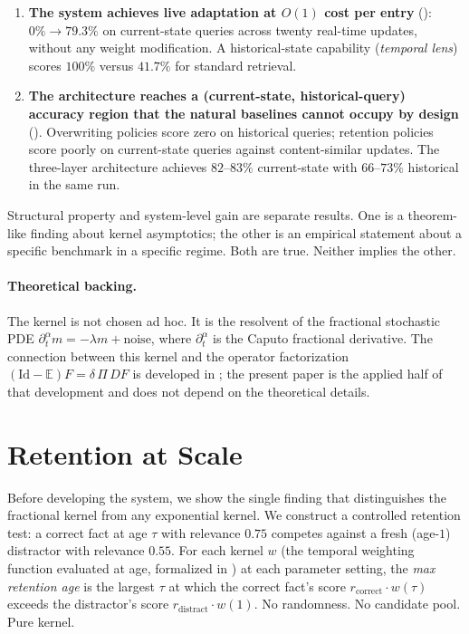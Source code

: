 \documentclass[11pt]{article}
\theoremstyle{plain}
\theoremstyle{definition}
\newcommand{\E}{\mathbb{E}}
\newcommand{\Id}{\mathrm{Id}}
\begin{document}
\begin{enumerate}[label=\textbf{(\arabic*)}]
\item \textbf{The system achieves live adaptation at
  $O(1)$ cost per entry} ():
  $0\% \to 79.3\%$ on current-state queries across
  twenty real-time updates, without any weight
  modification.  A historical-state capability
  (\emph{temporal lens}) scores $100\%$ versus
  $41.7\%$ for standard retrieval.

\item \textbf{The architecture reaches a
  (current-state, historical-query) accuracy region
  that the natural baselines cannot occupy by
  design} ().  Overwriting
  policies score zero on historical queries;
  retention policies score poorly on current-state
  queries against content-similar updates.  The
  three-layer architecture achieves $82$--$83\%$
  current-state with $66$--$73\%$ historical in
  the same run.
\end{enumerate}

Structural property and system-level gain are
separate results.  One is a theorem-like finding about
kernel asymptotics; the other is an empirical
statement about a specific benchmark in a specific
regime.  Both are true.  Neither implies the other.

\paragraph{Theoretical backing.}  The kernel is not
chosen ad hoc.  It is the resolvent of the fractional
stochastic PDE
$\partial_t^\alpha m = -\lambda m + \mathrm{noise}$,
where $\partial_t^\alpha$ is the Caputo fractional
derivative.  The connection between this kernel and
the operator factorization
$(\Id - \E)F = \delta\,\Pi\,DF$ is developed in
\cite{fontes2026opfac,fontes2026fracmem}; the present
paper is the applied half of that development and
does not depend on the theoretical details.


\section{Retention at Scale}\label{sec:chart}

Before developing the system, we show the single
finding that distinguishes the fractional kernel from
any exponential kernel.  We construct a controlled
retention test: a correct fact at age $\tau$ with
relevance $0.75$ competes against a fresh
(age-$1$) distractor with relevance $0.55$.
For each kernel $w$ (the temporal weighting function
evaluated at age, formalized in )
at each parameter setting,
the \emph{max retention age} is the largest $\tau$ at
which the correct fact's score
$r_\text{correct}\cdot w(\tau)$ exceeds the
distractor's score $r_\text{distract}\cdot w(1)$.
No randomness.  No candidate pool.  Pure kernel.
\end{document}
